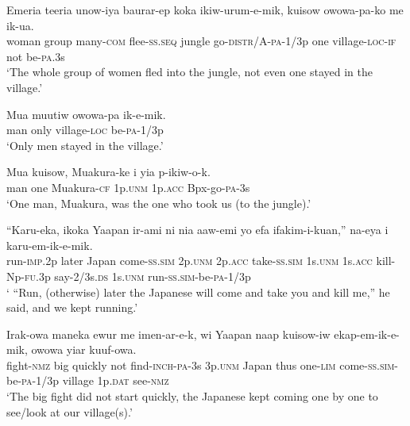 \ea\label{ex:a:x22}
\gll  Emeria  teeria  unow-iya  baurar-ep  koka   ikiw-urum-e-mik,  kuisow  owowa-pa-ko  me  ik-ua. \\
woman  group  many-\textsc{com}  flee-\textsc{ss.seq}  jungle go-\textsc{distr}/A-\textsc{pa}-1/3p  one  village-\textsc{loc}-\textsc{if}  not  be-\textsc{pa}.3s\\
\glt ‘The whole group of women fled into the jungle, not even one stayed in the village.’ \\
\z


\ea\label{ex:a:x23}
\gll  Mua  muutiw  owowa-pa  ik-e-mik. \\
man  only  village-\textsc{loc}  be-\textsc{pa}-1/3p \\
\glt ‘Only men stayed in the village.’ \\
\z


\ea\label{ex:a:x24}
\gll  Mua  kuisow,  Muakura-ke  i  yia  p-ikiw-o-k. \\
man  one  Muakura-\textsc{cf}  1p.\textsc{unm}  1p.\textsc{acc}  Bpx-go-\textsc{pa}-3s \\
\glt ‘One man, Muakura, was the one who took us (to the jungle).’ \\
\z


\ea\label{ex:a:x25}
\gll  “Karu-eka,  ikoka  Yaapan  ir-ami  ni  nia  aaw-emi  yo  efa  ifakim-i-kuan,”  na-eya i  karu-em-ik-e-mik. \\
run-\textsc{imp}.2p  later  Japan  come-\textsc{ss}.\textsc{sim}  2p.\textsc{unm}  2p.\textsc{acc}   take-\textsc{ss}.\textsc{sim}  1s.\textsc{unm}  1s.\textsc{acc}  kill-Np-\textsc{fu}.3p  say-2/3s.\textsc{ds} 1s.\textsc{unm}  run-\textsc{ss}.\textsc{sim}-be-\textsc{pa}-1/3p \\
\glt ‘ “Run, (otherwise) later the Japanese will come and take you and kill me,” he said, and we kept running.’ \\
\z


\ea\label{ex:a:x26}
\gll  Irak-owa  maneka  ewur  me  imen-ar-e-k,      wi  Yaapan  naap  kuisow-iw  ekap-em-ik-e-mik, owowa  yiar  kuuf-owa. \\  
fight-\textsc{nmz}  big  quickly  not  find-\textsc{inch}-\textsc{pa}-3s 3p.\textsc{unm}  Japan  thus  one-\textsc{lim}  come-\textsc{ss}.\textsc{sim}-be-\textsc{pa}-1/3p village  1p.\textsc{dat}  see-\textsc{nmz} \\ 
\glt ‘The big fight did not start quickly, the Japanese kept coming one by one to see/look at our village(s).’ \\
\z



